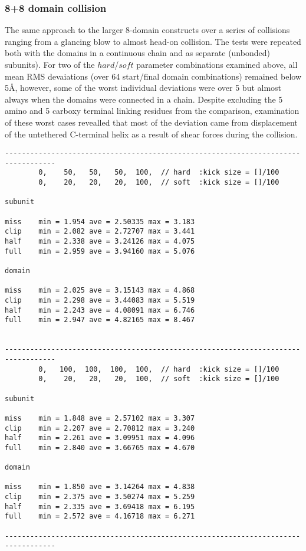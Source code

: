 \subsubsection{8+8 domain collision}

The same approach to the larger 8-domain constructs over a series of collisions 
ranging from a glancing blow to almost head-on collision.  The tests were repeated
both with the domains in a continuous chain and as separate (unbonded) subunits).
For two of the $hard$/$soft$ parameter combinations examined above, all mean RMS
devaiations (over 64 start/final domain combinations) remained below 5\AA, however,
some of the worst individual deviations were over 5 but almost always when the
domains were connected in a chain.   Despite excluding the 5 amino and 5 carboxy
terminal linking residues from the comparison, examination of these worst cases
revealled that most of the deviation came from displacement of the untethered C-terminal
helix as a result of shear forces during the collision.

\begin{verbatim}
----------------------------------------------------------------------------------
        0,    50,   50,   50,  100,  // hard  :kick size = []/100
        0,    20,   20,   20,  100,  // soft  :kick size = []/100

subunit

miss	min = 1.954 ave = 2.50335 max = 3.183
clip	min = 2.082 ave = 2.72707 max = 3.441
half	min = 2.338 ave = 3.24126 max = 4.075
full	min = 2.959 ave = 3.94160 max = 5.076

domain

miss	min = 2.025 ave = 3.15143 max = 4.868
clip	min = 2.298 ave = 3.44083 max = 5.519
half	min = 2.243 ave = 4.08091 max = 6.746
full	min = 2.947 ave = 4.82165 max = 8.467


----------------------------------------------------------------------------------
        0,   100,  100,  100,  100,  // hard  :kick size = []/100
        0,    20,   20,   20,  100,  // soft  :kick size = []/100

subunit

miss	min = 1.848 ave = 2.57102 max = 3.307
clip	min = 2.207 ave = 2.70812 max = 3.240
half	min = 2.261 ave = 3.09951 max = 4.096
full	min = 2.840 ave = 3.66765 max = 4.670

domain

miss	min = 1.850 ave = 3.14264 max = 4.838
clip	min = 2.375 ave = 3.50274 max = 5.259
half	min = 2.335 ave = 3.69418 max = 6.195
full	min = 2.572 ave = 4.16718 max = 6.271

----------------------------------------------------------------------------------
\end{verbatim}
